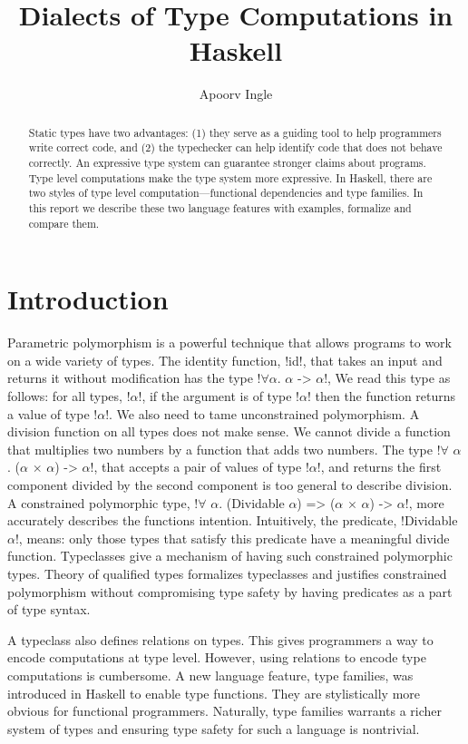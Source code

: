 \documentclass[format=acmsmall,manuscript,review,screen,nonacm,margin=1in,11pt]{acmart}
\title{Dialects of Type Computations in Haskell}
\author{Apoorv Ingle}
\affiliation{%
  \institution{University of Iowa}
  \department{Department of Computer Science}
  \streetaddress{McLean Hall}
  \city{Iowa City}
  \state{Iowa}
  \country{USA}}
\begin{document}
\begin{abstract}
  Static types have two advantages: (1) they serve as a guiding tool
  to help programmers write correct code, and (2) the typechecker
  can help identify code that does not behave correctly.
  An expressive type system can guarantee stronger claims about programs.
  Type level computations make the type system more expressive.
  In Haskell, there are two styles of type level computation---functional dependencies
  and type families. In this report we describe these two language features with examples,
  formalize and compare them.
\end{abstract}
\maketitle
\vspace{-1.25em}
\section{Introduction}
Parametric polymorphism is a powerful technique that allows programs to work on
a wide variety of types. The identity function, !id!, that takes an input and returns it
without modification has the type !$\forall$$\alpha$. $\alpha$ -> $\alpha$!,
We read this type as follows: for all types, !$\alpha$!, if the argument is of type !$\alpha$!
then the function returns a value of type !$\alpha$!.
We also need to tame unconstrained polymorphism.
A division function on all types does not make sense. We cannot
divide a function that multiplies two numbers by a function that adds two numbers.
The type !$\forall$ $\alpha$. ($\alpha$ $\times$ $\alpha$) -> $\alpha$!, that accepts
a pair of values of type !$\alpha$!, and returns the first component divided by the
second component is too general to describe division. A constrained polymorphic type,
!$\forall$ $\alpha$. (Dividable $\alpha$) => ($\alpha$ $\times$ $\alpha$) -> $\alpha$!,
more accurately describes the functions intention. Intuitively, the predicate,
!Dividable $\alpha$!, means: only those types that satisfy this predicate
have a meaningful divide function. Typeclasses\cite{wadler_polymorphism_1989} give a mechanism
of having such constrained polymorphic types. Theory of qualified types\cite{jones_qualified_1994}
formalizes typeclasses and justifies constrained polymorphism
without compromising type safety by having predicates as a part of type syntax.

A typeclass also defines relations on types. This gives programmers a way to
encode computations at type level. However, using relations to encode type computations
is cumbersome. A new language feature, type families\cite{schrijvers_towards_2007}, was introduced in Haskell
to enable type functions. They are stylistically more obvious for functional programmers.
Naturally, type families warrants a richer system of types and ensuring type safety
for such a language is nontrivial.
\end{document}
